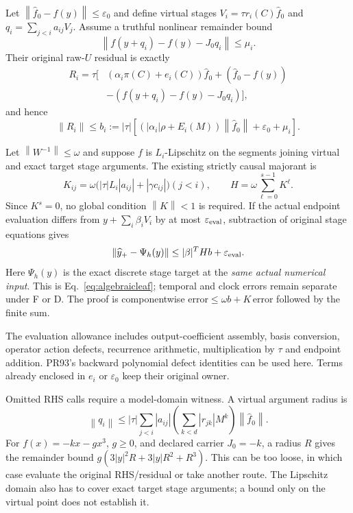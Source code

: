 \documentclass[aps,pra,reprint,onecolumn,10pt,notitlepage,nofootinbib]{revtex4-2}
\newcommand{\norm}[1]{\left\|#1\right\|}
\newcommand{\eps}{\varepsilon}
\begin{document}
Let $\norm{\widehat f_0-f(y)}\le\eps_0$ and define virtual stages
$V_i=\tau r_i(C)\widehat f_0$ and $q_i=\sum_{j<i}a_{ij}V_j$.
Assume a truthful nonlinear remainder bound
\begin{equation}
 \norm{f(y+q_i)-f(y)-J_0q_i}\le\mu_i.                        \label{eq:nonlinrem}
\end{equation}
Their original raw-$U$ residual is exactly
\begin{align}
 R_i=\tau\bigl[& (\alpha_i\pi(C)+e_i(C))\widehat f_0
   +(\widehat f_0-f(y))\nonumber\\
   &-(f(y+q_i)-f(y)-J_0q_i)\bigr],                          \label{eq:fullres}
\end{align}
and hence
\begin{equation}
 \norm{R_i}\le b_i:=|\tau|
  \left[(|\alpha_i|\rho+E_i(M))\norm{\widehat f_0}
        +\eps_0+\mu_i\right].                              \label{eq:resbound}
\end{equation}

Let $\norm{W^{-1}}\le\omega$ and suppose $f$ is $L_i$-Lipschitz on the
segments joining virtual and exact target stage arguments. The existing
strictly causal majorant is
\begin{equation}
 K_{ij}=\omega\bigl(|\tau|L_i|a_{ij}|+|\gamma c_{ij}|\bigr) (j<i),
 \qquad H=\omega\sum_{\ell=0}^{s-1}K^\ell.                  \label{eq:causal}
\end{equation}
Since $K^s=0$, no global condition $\norm{K}<1$ is required. If the actual
endpoint evaluation differs from $y+\sum_i\beta_iV_i$ by at most
$\eps_{\rm eval}$, subtraction of original stage equations gives
\begin{equation}
 \norm{\widehat y_+-\Psi_h(y)}
 \le |\beta|^T H b+\eps_{\rm eval}.                         \label{eq:compilerleaf}
\end{equation}
Here $\Psi_h(y)$ is the exact discrete stage target at the \emph{same actual
numerical input}. This is Eq.~\eqref{eq:algebraicleaf}; temporal and clock errors
remain separate under F or D. The proof is componentwise
$\mathrm{error}\le\omega b+K\,\mathrm{error}$ followed by the finite sum.

The evaluation allowance includes output-coefficient assembly, basis conversion,
operator action defects, recurrence arithmetic, multiplication by $\tau$ and
endpoint addition. PR93's backward polynomial defect identities can be used
here. Terms already enclosed in $e_i$ or $\eps_0$ keep their original owner.

Omitted RHS calls require a model-domain witness. A virtual argument radius is
\begin{equation}
 \norm{q_i}\le|\tau|\sum_{j<i}|a_{ij}|
       \left(\sum_{k<d}|r_{jk}|M^k\right)\norm{\widehat f_0}.
\end{equation}
For $f(x)=-kx-gx^3$, $g\ge0$, and declared carrier $J_0=-k$, a radius $R$
gives the remainder bound $g(3|y|^2R+3|y|R^2+R^3)$. This can be too loose,
in which case evaluate the original RHS/residual or take another route.
The Lipschitz domain also has to cover exact target stage arguments; a bound
only on the virtual point does not establish it.
\end{document}
